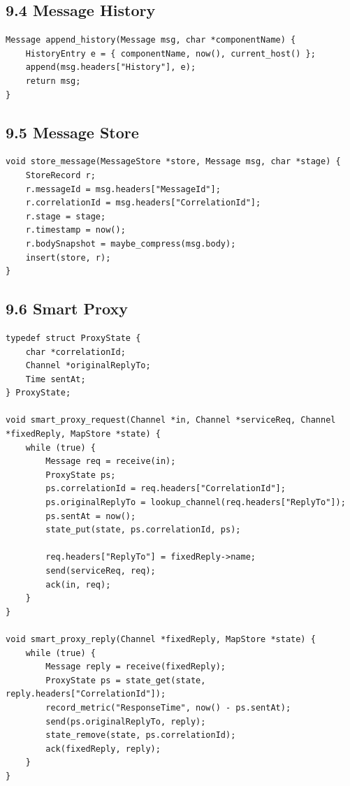 \documentclass[11pt]{article}
\begin{document}
\subsection{9.4 Message History}\label{message-history}

\begin{verbatim}
Message append_history(Message msg, char *componentName) {
    HistoryEntry e = { componentName, now(), current_host() };
    append(msg.headers["History"], e);
    return msg;
}
\end{verbatim}

\subsection{9.5 Message Store}\label{message-store}

\begin{verbatim}
void store_message(MessageStore *store, Message msg, char *stage) {
    StoreRecord r;
    r.messageId = msg.headers["MessageId"];
    r.correlationId = msg.headers["CorrelationId"];
    r.stage = stage;
    r.timestamp = now();
    r.bodySnapshot = maybe_compress(msg.body);
    insert(store, r);
}
\end{verbatim}

\subsection{9.6 Smart Proxy}\label{smart-proxy}

\begin{verbatim}
typedef struct ProxyState {
    char *correlationId;
    Channel *originalReplyTo;
    Time sentAt;
} ProxyState;

void smart_proxy_request(Channel *in, Channel *serviceReq, Channel *fixedReply, MapStore *state) {
    while (true) {
        Message req = receive(in);
        ProxyState ps;
        ps.correlationId = req.headers["CorrelationId"];
        ps.originalReplyTo = lookup_channel(req.headers["ReplyTo"]);
        ps.sentAt = now();
        state_put(state, ps.correlationId, ps);

        req.headers["ReplyTo"] = fixedReply->name;
        send(serviceReq, req);
        ack(in, req);
    }
}

void smart_proxy_reply(Channel *fixedReply, MapStore *state) {
    while (true) {
        Message reply = receive(fixedReply);
        ProxyState ps = state_get(state, reply.headers["CorrelationId"]);
        record_metric("ResponseTime", now() - ps.sentAt);
        send(ps.originalReplyTo, reply);
        state_remove(state, ps.correlationId);
        ack(fixedReply, reply);
    }
}
\end{verbatim}
\end{document}
